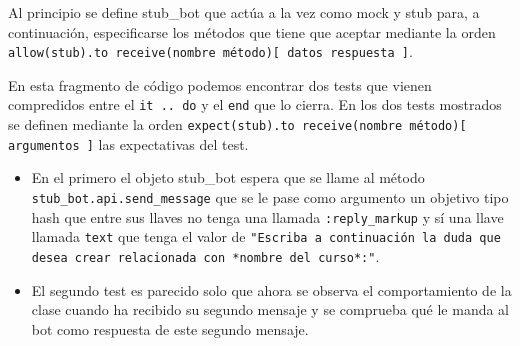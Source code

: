 Al principio se define stub\_bot que actúa a la vez como mock y stub para, a continuación, especificarse los métodos que tiene que aceptar mediante la orden \texttt{allow(stub).to receive(nombre método)[ datos respuesta ]}.
\par
En esta fragmento de código podemos encontrar dos tests que vienen compredidos entre el \texttt{it .. do} y el \texttt{end} que lo cierra. En los dos tests mostrados  se definen mediante la orden \texttt{expect(stub).to receive(nombre método)[  argumentos ]} las expectativas del test.
\begin{itemize}
 \item En el primero el objeto stub\_bot espera que se llame al método \texttt{stub\_bot.api.send\_message} que se le pase como argumento un objetivo tipo hash que entre sus llaves no tenga una llamada \texttt{:reply\_markup} y sí una llave llamada \texttt{text} que tenga el valor de \texttt{"Escriba a continuación la duda que desea crear relacionada con *nombre del curso*:"}. 
 \item El segundo test es parecido solo que ahora se observa el comportamiento de la clase cuando ha recibido su segundo mensaje y se comprueba qué le manda al bot como respuesta de este segundo mensaje.
 \end{itemize}